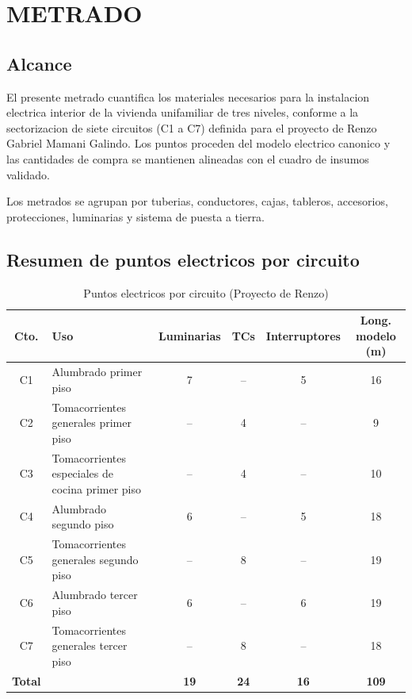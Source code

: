 \chapter{METRADO}

\section{Alcance}

El presente metrado cuantifica los materiales necesarios para la instalacion electrica interior de la vivienda unifamiliar de tres niveles, conforme a la sectorizacion de siete circuitos (C1 a C7) definida para el proyecto de Renzo Gabriel Mamani Galindo. Los puntos proceden del modelo electrico canonico y las cantidades de compra se mantienen alineadas con el cuadro de insumos validado.

Los metrados se agrupan por tuberias, conductores, cajas, tableros, accesorios, protecciones, luminarias y sistema de puesta a tierra.

\section{Resumen de puntos electricos por circuito}

\begin{table}[H]
\centering
\small
\caption{Puntos electricos por circuito (Proyecto de Renzo)}
\label{tab:puntos-por-circuito}
\begin{tabularx}{\textwidth}{c L{5.0cm} c c c c}
\toprule
\textbf{Cto.} & \textbf{Uso} & \textbf{Luminarias} & \textbf{TCs} & \textbf{Interruptores} & \textbf{Long. modelo (m)} \\
\midrule
C1 & Alumbrado primer piso & 7 & -- & 5 & 16 \\
C2 & Tomacorrientes generales primer piso & -- & 4 & -- & 9 \\
C3 & Tomacorrientes especiales de cocina primer piso & -- & 4 & -- & 10 \\
C4 & Alumbrado segundo piso & 6 & -- & 5 & 18 \\
C5 & Tomacorrientes generales segundo piso & -- & 8 & -- & 19 \\
C6 & Alumbrado tercer piso & 6 & -- & 6 & 19 \\
C7 & Tomacorrientes generales tercer piso & -- & 8 & -- & 18 \\
\midrule
\textbf{Total} & & \textbf{19} & \textbf{24} & \textbf{16} & \textbf{109} \\
\bottomrule
\end{tabularx}
\end{table}

